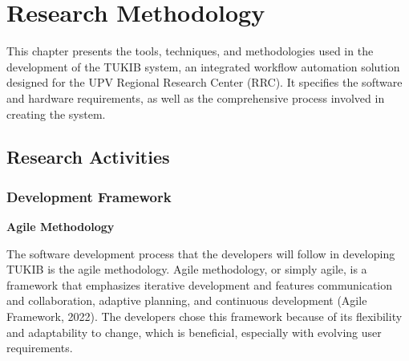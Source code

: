 \chapter{Research Methodology}
This chapter presents the tools, techniques, and methodologies used in the development of the TUKIB system, an integrated workflow automation solution designed for the UPV Regional Research Center (RRC). It specifies the software and hardware requirements, as well as the comprehensive process involved in creating the system.

\section{Research Activities}

\subsection{Development Framework}

\textbf{Agile Methodology}

The software development process that the developers will follow in developing TUKIB is the agile methodology. Agile methodology, or simply agile, is a framework that emphasizes iterative development and features communication and collaboration, adaptive planning, and continuous development (Agile Framework, 2022). The developers chose this framework because of its flexibility and adaptability to change, which is beneficial, especially with evolving user requirements. 

